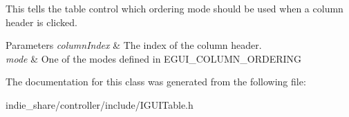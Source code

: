 This tells the table control which ordering mode should be used when a column header is clicked. 


\begin{DoxyParams}{Parameters}
{\em column\+Index} & The index of the column header. \\
\hline
{\em mode} & One of the modes defined in E\+G\+U\+I\+\_\+\+C\+O\+L\+U\+M\+N\+\_\+\+O\+R\+D\+E\+R\+I\+NG \\
\hline
\end{DoxyParams}


The documentation for this class was generated from the following file\+:\begin{DoxyCompactItemize}
\item 
indie\+\_\+share/controller/include/I\+G\+U\+I\+Table.\+h\end{DoxyCompactItemize}
